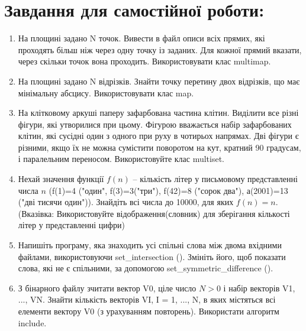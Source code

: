 \documentclass[a5paper,titlepage,openany,twoside,draft]{book_unv}%
\begin{document}
\section{Завдання для самостійної роботи:}

\begin{enumerate}
\def\labelenumi{\arabic{enumi})}
\setcounter{enumi}{3}
\item
  На площині задано N точок. Вивести в файл описи всіх прямих, які
  проходять більш ніж через одну точку із заданих. Для кожної прямий
  вказати, через скільки точок вона проходить. Використовувати клас
  multimap.
\item
  На площині задано N відрізків. Знайти точку перетину двох відрізків,
  що має мінімальну абсцису. Використовувати клас map.
\item
  На клітковому аркуші паперу зафарбована частина клітин. Виділити все
  різні фігури, які утворилися при цьому. Фігурою вважається набір
  зафарбованих клітин, які сусідні один з одного при руху в чотирьох
  напрямах. Дві фігури є різними, якщо їх не можна сумістити поворотом
  на кут, кратний 90 градусам, і паралельним переносом. Використовуйте
  клас multiset.
\item
  Нехай значення функції $f(n)$ -- кількість літер у письмовому
  представленні числа $n$ (f(1)=4 ("один", f(3)=3("три"), f(42)=8
  ("сорок два"), а(2001)=13 ("дві тисячи один")). Знайдіть всі числа до
  10000, для яких $f(n) = n$. (Вказівка: Використовуйте
  відображення(словник) для зберігання кількості літер у представленні
  цифри)

\item
  Напишіть програму, яка знаходить усі спільні слова між двома вхідними
  файлами, використовуючи set\_intersection (). Змініть його, щоб
  показати слова, які не є спільними, за допомогою
  set\_symmetric\_difference ().

\item
З бінарного файлу зчитати вектор V0, ціле число $N > 0$ і набір векторів
V1, ..., VN.  Знайти кількість векторів VI,
I = 1, ..., N, в яких містяться всі елементи вектору V0 (з урахуванням повторень). 
Використати алгоритм include.


\end{enumerate}
\end{document}

